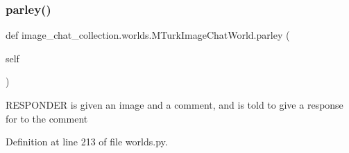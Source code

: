 \subsubsection{\texorpdfstring{parley()}{parley()}}
{\footnotesize\ttfamily def image\+\_\+chat\+\_\+collection.\+worlds.\+M\+Turk\+Image\+Chat\+World.\+parley (\begin{DoxyParamCaption}\item[{}]{self }\end{DoxyParamCaption})}

\begin{DoxyVerb}RESPONDER is given an image and a comment, and is told to give a
response for to the comment\end{DoxyVerb}
 

Definition at line 213 of file worlds.\+py.



